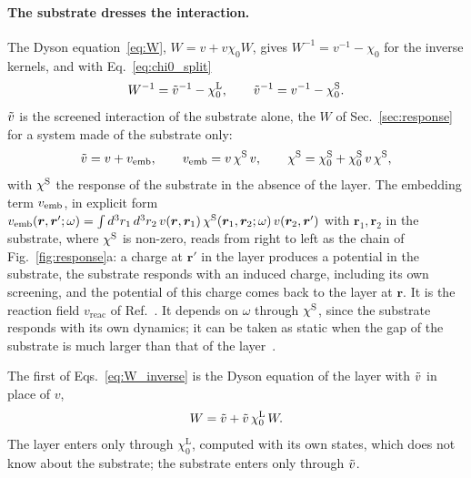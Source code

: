 \documentclass[10pt,a4paper]{paper}
\begin{document}
\paragraph{The substrate dresses the interaction.} The Dyson equation~\eqref{eq:W}, $W = v + v\chi_0W$, gives
$W^{-1} = v^{-1} - \chi_0$ for the inverse kernels, and with Eq.~\eqref{eq:chi0_split}~\cite[Eqs.~(8)--(9)]{amblard2024static}
\begin{equation}
W^{-1} = \tilde{v}^{-1} - \chi_0^{\mathrm{L}} , \qquad \tilde{v}^{-1} = v^{-1} - \chi_0^{\mathrm{S}} .
\label{eq:W_inverse}
\end{equation}
$\tilde{v}$ is the screened interaction of the substrate alone, the $W$ of Sec.~\ref{sec:response} for a system made of
the substrate only:
\begin{equation}
\tilde{v} = v + v_{\mathrm{emb}} , \qquad v_{\mathrm{emb}} = v\,\chi^{\mathrm{S}}\,v , \qquad \chi^{\mathrm{S}} = \chi_0^{\mathrm{S}} + \chi_0^{\mathrm{S}}\,v\,\chi^{\mathrm{S}} ,
\label{eq:vt_general}
\end{equation}
with $\chi^{\mathrm{S}}$ the response of the substrate in the absence of the layer. The embedding term $v_{\mathrm{emb}}$, in explicit form
$v_{\mathrm{emb}}(\bm{r},\bm{r}';\omega) = \int d^3r_1\,d^3r_2\,v(\bm{r},\bm{r}_1)\,\chi^{\mathrm{S}}(\bm{r}_1,\bm{r}_2;\omega)\,
v(\bm{r}_2,\bm{r}')$ with $\bm{r}_1,\bm{r}_2$ in the substrate, where $\chi^{\mathrm{S}}$ is non-zero, reads from right to left as
the chain of Fig.~\ref{fig:response}a: a charge at $\bm{r}'$ in the layer produces a potential in the substrate, the
substrate responds with an induced charge, including its own screening, and the potential of this charge comes back
to the layer at $\bm{r}$. It is the reaction field $v_{\mathrm{reac}}$ of Ref.~\cite{amblard2024static}. It depends on
$\omega$ through $\chi^{\mathrm{S}}$, since the substrate responds with its own dynamics; it can be taken as static when the gap
of the substrate is much larger than that of the layer~\cite{amblard2024static}.

The first of Eqs.~\eqref{eq:W_inverse} is the Dyson equation of the layer with $\tilde{v}$ in place of $v$,
\begin{equation}
W = \tilde{v} + \tilde{v}\,\chi_0^{\mathrm{L}}\,W .
\label{eq:W_layer}
\end{equation}
The layer enters only through $\chi_0^{\mathrm{L}}$, computed with its own states, which does not know about the
substrate; the substrate enters only through $\tilde{v}$.
\end{document}
